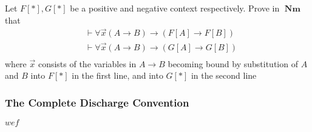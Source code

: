 \documentclass[11pt]{article}
\DeclareMathOperator{\Nm}{\textbf{Nm}}
\begin{document}
\begin{exercise}
Let \(F[*],G[*]\) be a positive and negative context respectively. Prove in
\(\Nm\) that
\begin{align*}
&\vdash\forall\overrightarrow{x}(A\to B)\to(F[A]\to F[B])\\
&\vdash\forall\overrightarrow{x}(A\to B)\to(G[A]\to G[B])\\
\end{align*}
where \(\overrightarrow{x}\) consists of the variables in \(A\to B\) becoming
bound by substitution of \(A\) and \(B\) into \(F[*]\) in the first line, and into
\(G[*]\) in the second line
\end{exercise}
\subsubsection{The Complete Discharge Convention}
\label{sec:org8aa549d}
\(wef\)
\end{document}
